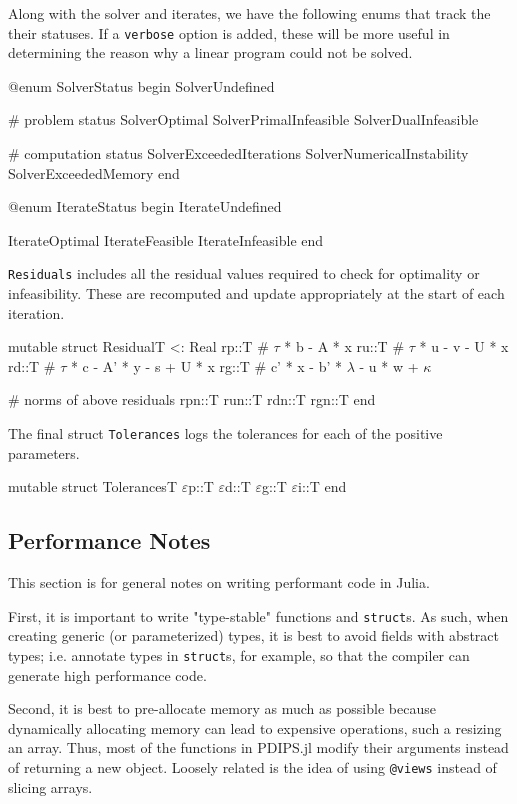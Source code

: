 \documentclass[titlepage]{abhi-tufte-handout}
\begin{document}
Along with the solver and iterates, we have the following enums that track the
their statuses. If a \texttt{verbose} option is added, these will be more useful
in determining the reason why a linear program could not be solved.
\begin{dispjulia}
@enum SolverStatus begin
    SolverUndefined

    # problem status
    SolverOptimal
    SolverPrimalInfeasible
    SolverDualInfeasible

    # computation status
    SolverExceededIterations
    SolverNumericalInstability
    SolverExceededMemory
end

@enum IterateStatus begin
    IterateUndefined

    IterateOptimal
    IterateFeasible
    IterateInfeasible
end
\end{dispjulia}

\texttt{Residuals} includes all the residual values required to check for
optimality or infeasibility. These are recomputed and update appropriately at
the start of each iteration.
\begin{dispjulia}
mutable struct Residual{T <: Real}
  rp::T # $\tau$ * b - A * x
  ru::T # $\tau$ * u - v - U * x
  rd::T # $\tau$ * c - A' * y - s + U * x
  rg::T # c' * x - b' * $\lambda$ - u * w + $\kappa$

  # norms of above residuals
  rpn::T
  run::T
  rdn::T
  rgn::T
end
\end{dispjulia}

The final struct \texttt{Tolerances} logs the tolerances for each of the
positive parameters.
\begin{dispjulia}
mutable struct Tolerances{T}
    $\varepsilon$p::T
    $\varepsilon$d::T
    $\varepsilon$g::T
    $\varepsilon$i::T
end
\end{dispjulia}

\subsection{Performance Notes}\label{sec:perf-notes}
This section is for general notes on writing performant code in Julia.

First, it is important to write "type-stable" functions and \texttt{struct}s.
As such, when creating generic (or parameterized) types, it is best to
avoid fields with abstract types; i.e. annotate types in \texttt{struct}s, for
example, so that the compiler can generate high performance code.

Second, it is best to pre-allocate memory as much as possible because
dynamically allocating memory can lead to expensive operations, such a resizing
an array. Thus, most of the functions in PDIPS.jl modify their arguments instead
of returning a new object. Loosely related is the idea of using \texttt{@views}
instead of slicing arrays.
\end{document}
